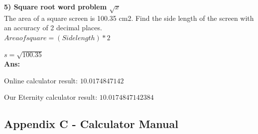 \documentclass[a4paper, 12pt]{article}
\begin{document}
\textbf{5) Square root word problem $\sqrt{x}$}
\\

The area of a square screen is 100.35 cm2. Find the side length of the screen with an accuracy of 2 decimal places.
\\

$Area of square = (Side length) * 2$

$s = \sqrt{100.35}$
\\

\textbf{Ans:}

Online calculator result: $10.0174847142$

Our Eternity calculator result: $10.0174847142384$

\pagebreak

\subsection{Appendix C - Calculator Manual}
\end{document}
